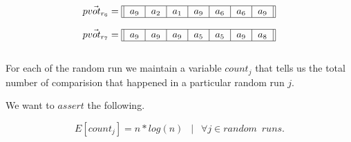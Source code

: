 \documentclass[usenames,dvipsnames,acmsmall]{acmart}
\begin{document}
\begin{equation}
	\vec{pvot_{r_{6}}} = \begin{tabular}{||c|c|c|c|c|c|c||}
		\hline
		$a_9$ & $a_2$ & $a_1$ & $a_9$ & $a_6$ & $a_6$ & $a_9$ \\
		\hline
	\end{tabular}
\end{equation} 

\begin{equation}
	\vec{pvot_{r_{7}}} = \begin{tabular}{||c|c|c|c|c|c|c||}
		\hline
		$a_9$ & $a_9$ & $a_9$ & $a_5$ & $a_5$ & $a_9$ & $a_8$ \\
		\hline
	\end{tabular}
\end{equation} \\

For each of the random run we maintain a variable $count_j$ that tells us the total number of comparision that happened in a particular random run $j$.

We want to $assert$ the following. 

\begin{equation}
	E[count_j] = n * log(n) \enspace \mid \enspace \forall j \in random \enspace runs.
\end{equation} 
\end{document}
